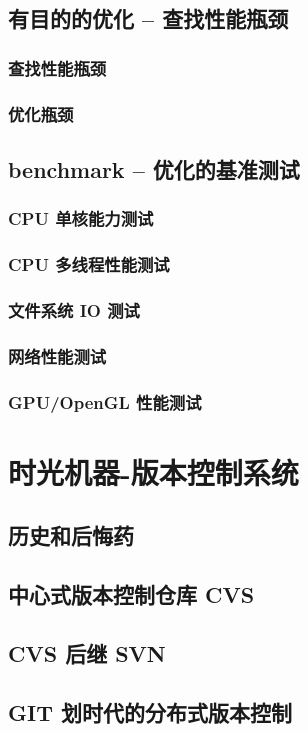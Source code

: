 \documentclass[amstex]{ctexbook}
\begin{document}
\section{  有目的的优化 – 查找性能瓶颈}
\subsection{ 查找性能瓶颈}
\subsection{  优化瓶颈}
\section{  benchmark – 优化的基准测试}
\subsection{  CPU 单核能力测试}
\subsection{  CPU 多线程性能测试}
\subsection{  文件系统 IO 测试}
\subsection{  网络性能测试}
\subsection{  GPU/OpenGL 性能测试}


\chapter{时光机器-版本控制系统}
\section{   历史和后悔药	}
\section{   中心式版本控制仓库 CVS	}
\section{   CVS 后继 SVN	}
\section{   GIT 划时代的分布式版本控制	}
\end{document}
